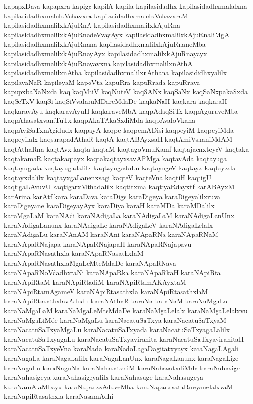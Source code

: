 {kapapxDava
kapapxra
kapige
kapilA
kapila
kapilasidadhx
kapilasidadhxmalalxna
kapilasidadhxmalelxVshavxra
kapilasidadhxmalelxVshavxraM
kapilasidadhxmalilxkAjuRnA
kapilasidadhxmalilxkAjuRna
kapilasidadhxmalilxkAjuRnadeVvayAyx
kapilasidadhxmalilxkAjuRnaliMgA
kapilasidadhxmalilxkAjuRnana
kapilasidadhxmalilxkAjuRnaneMba
kapilasidadhxmalilxkAjuRnayAyx
kapilasidadhxmalilxkAjuRnayayx
kapilasidadhxmalilxkAjuRnayayxna
kapilasidadhxmalilxnAthA
kapilasidadhxmalilxnAtha
kapilasidadhxmalilxnAthana
kapilasididhxyalilx
kapilavaNaR
kapileyaM
kapoVta
kapuRra
kapuRrada
kapuRrava
kapupxbaNaNxda
kaq
kaqMtiV
kaqNuteV
kaqSANx
kaqSaNx
kaqSaNxpakaSxda
kaqSeTxV
kaqSi
kaqSiVvalaruMDareMdaDe
kaqkaNaH
kaqkara
kaqkaraH
kaqkaravAyu
kaqkaravAyuH
kaqkaraveMbA
kaqpAdaqSiTx
kaqpAguruveMba
kaqpAhasatxvaniTuTx
kaqpAkaTAkaSxdiMda
kaqpAvaloVkana
kaqpAviSaTxnAgidudx
kaqpayA
kaqpe
kaqpemADisi
kaqpeyiM
kaqpeyiMda
kaqpeyilalx
kaqsarapadAthaR
kaqtA
kaqtABAyxsaH
kaqtAmiVshaniMdAM
kaqtAthaRna
kaqtAvx
kaqta
kaqtaM
kaqtagoVmuKamf
kaqtajacnxteyeV
kaqtaka
kaqtakamaR
kaqtakaqtayx
kaqtakaqtayxsavARMga
kaqtavAda
kaqtayuga
kaqtayugada
kaqtayugadalilx
kaqtayugadoLu
kaqtayugeV
kaqtayx
kaqtayxda
kaqtayxdalilx
kaqtayxgaLanenxsagi
kaqteV
kaqteVna
kaqtiH
kaqtigU
kaqtigaLAvuvU
kaqtigarxMthadalilx
kaqtitxma
kaqtiyaRdayxtf
karABAyxM
karArina
karAtf
kara
karaDava
karaDige
karaDigeya
karaDigeyalilxruva
karaDigeyane
karaDigeyayAyx
karaDiya
karaH
karaMDa
karaMDalilx
karaMgaLaM
karaNAdi
karaNAdigaLa
karaNAdigaLaM
karaNAdigaLanUnx
karaNAdigaLanunx
karaNAdigaLe
karaNAdigaLeV
karaNAdigaLelalx
karaNAdigaLu
karaNAnAM
karaNAni
karaNApaRNa
karaNApaRNaM
karaNApaRNajapa
karaNApaRNajapaH
karaNApaRNajapavu
karaNApaRNasathxla
karaNApaRNasathxlaM
karaNApaRNasathxlaMgaLeMteMdaDe
karaNApaRNava
karaNApaRNoVdadhxraNi
karaNApaRka
karaNApaRkaH
karaNApiRta
karaNApiRtaM
karaNApiRtadiM
karaNApiRtamAKAyxtaM
karaNApiRtamAgameV
karaNApiRtasathxla
karaNApiRtasathxlaM
karaNApiRtasathxlavAdudu
karaNAthaR
karaNa
karaNaM
karaNaMgaLa
karaNaMgaLaM
karaNaMgaLeMteMdaDe
karaNaMgaLelalx
karaNaMgaLelalxvu
karaNaMgaLiMde
karaNaMgaLu
karaNacatuSaTxya
karaNacatuSaTxyaM
karaNacatuSaTxyaMgaLu
karaNacatuSaTxyada
karaNacatuSaTxyagaLalilx
karaNacatuSaTxyagaLu
karaNacatuSaTxyavirahita
karaNacatuSaTxyavirahitaH
karaNacatuSaTxyeVna
karaNada
karaNadoLagaDagitatxyayx
karaNagaLAgali
karaNagaLa
karaNagaLalilx
karaNagaLanUnx
karaNagaLanunx
karaNagaLige
karaNagaLu
karaNaguNa
karaNahasatxdiM
karaNahasatxdiMda
karaNahasige
karaNahasigeya
karaNahasigeyalilx
karaNahasuge
karaNahasugeya
karaNamAlaMbayx
karaNaparxsAdaveMba
karaNaparxvataRneyanelalxvaM
karaNapiRtasathxla
karaNasamAdhi
}
